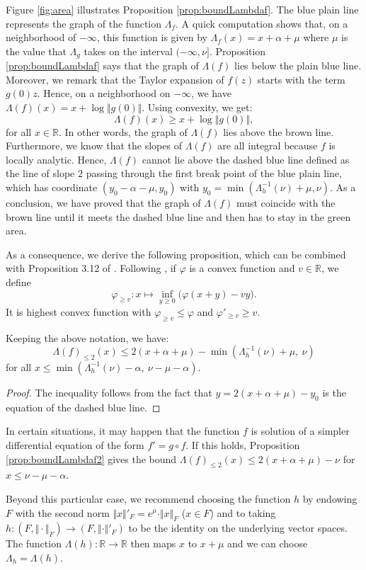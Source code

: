 \documentclass{sig-alternate}
\newcommand{\R}{\mathbb R}
\begin{document}
Figure \ref{fig:area} illustrates Proposition \ref{prop:boundLambdaf}. 
The blue plain line represents the graph of the function $\Lambda_f$. A 
quick computation shows that, on a neighborhood of ${-}\infty$, this 
function is given by $\Lambda_f(x) = x + \alpha + \mu$
where $\mu$ is the value that $\Lambda_g$ takes on the interval 
$({-}\infty, \nu]$. Proposition \ref{prop:boundLambdaf} says that the
graph of $\Lambda(f)$ lies below the plain blue line. Moreover, we remark
that the Taylor expansion of $f(z)$ starts with the term
$g(0) z$. Hence, on a neighborhood on ${-}\infty$, we have 
$\Lambda(f)(x) = x + \log \Vert g(0) \Vert$. Using convexity, we 
get:
\[
\Lambda(f)(x) \geq x + \log \Vert g(0) \Vert,
\]
for all $x \in \R$.  In other words, the graph of $\Lambda(f)$ lies above the brown line.
Furthermore, we know that the slopes of $\Lambda(f)$ are all integral
because $f$ is locally analytic. Hence, $\Lambda(f)$ cannot lie above
the dashed blue line defined as the line of slope $2$ passing through
the first break point of the blue plain line, which has coordinate 
$(y_0 - \alpha - \mu, y_0)$ with $y_0 = \min(\Lambda_h^{-1}(\nu) + \mu, 
\nu)$. As a conclusion, we have proved that the graph of $\Lambda(f)$ 
must coincide with the brown line until it meets the dashed blue line 
and then has to stay in the green area.

As a consequence, we derive the following 
proposition, which can be combined with Proposition 3.12 of 
\cite{caruso-roe-vaccon:14a}. Following \cite{caruso-roe-vaccon:14a},
if $\varphi$ is a convex function and $v \in \R$, we define
$$\varphi_{\geq v} : x \mapsto \inf_{y \geq 0} \big( \varphi(x+y)
- vy \big).$$
It is highest convex function with $\varphi_{\geq v} \leq \varphi$ and 
$\varphi'_{\geq v} \geq v$.

\begin{prop}
\label{prop:boundLambdaf2}
Keeping the above notation, we have:
$$\Lambda(f)_{\leq 2} (x) \leq 2(x + \alpha + \mu) -
\min(\Lambda_h^{-1}(\nu) + \mu, \: \nu)$$
for all $x \leq \min(\Lambda_h^{-1}(\nu) - \alpha, \: \nu - \mu - \alpha)$.
\end{prop}

\begin{proof}
The inequality follows from the fact that $y = 2(x + \alpha + \mu) - y_0$ is the equation of 
the dashed blue line.
\end{proof}

\begin{rem}
In certain situations,
it may happen that the function $f$ is solution of a simpler 
differential equation of the form $f' = g \circ f$. If this holds, 
Proposition \ref{prop:boundLambdaf2} gives the bound $\Lambda(f)_{\leq 
2} (x) \leq 2(x + \alpha + \mu) - \nu$ for $x \leq \nu - \mu - \alpha$.

Beyond this particular case, we recommend choosing the 
function $h$ by endowing $F$ with the second norm $\Vert x \Vert'_F = 
e^\mu \cdot \Vert x \Vert_F$ ($x \in F$) and to taking $h : (F, \Vert 
\cdot \Vert_F) \to (F, \Vert \cdot \Vert'_F)$ to be the identity on the
underlying vector spaces. The function $\Lambda(h) : \R \to \R$ then maps $x$ to $x + 
\mu$ and we can choose $\Lambda_h = \Lambda(h)$.
\end{rem}
\end{document}
